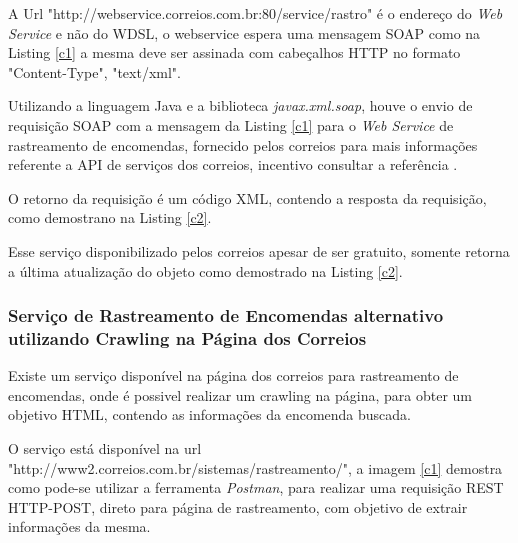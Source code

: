 \documentclass[12pt]{article}
\begin{document}
A Url "http://webservice.correios.com.br:80/service/rastro" é o endereço do \textit{Web Service} e não do WDSL, o webservice espera uma mensagem SOAP como na Listing \ref{c1} a mesma deve ser assinada com cabeçalhos HTTP no formato "Content-Type", "text/xml".


Utilizando a linguagem Java e a biblioteca \textit{javax.xml.soap}, houve o envio de requisição SOAP com a mensagem da Listing \ref{c1} para o \textit{Web Service} de rastreamento de encomendas, fornecido pelos correios para mais informações referente a API de serviços dos correios, incentivo consultar a referência \cite{correios}.

O retorno da requisição é um código XML, contendo a resposta da requisição, como demostrano na Listing \ref{c2}.
 
 Esse serviço disponibilizado pelos correios apesar de ser gratuito, somente retorna a última atualização do objeto como demostrado na Listing \ref{c2}.
\subsubsection{Serviço de Rastreamento de Encomendas alternativo utilizando Crawling na Página dos Correios}

	Existe um serviço disponível na página dos correios para rastreamento de encomendas, onde é possivel realizar um crawling na página, para obter um objetivo HTML, contendo as informações da encomenda buscada.
	
	O serviço está disponível na url "http://www2.correios.com.br/sistemas/rastreamento/", a imagem \ref{c1} demostra como pode-se utilizar a ferramenta \textit{Postman}, para realizar uma requisição REST HTTP-POST, direto para página de rastreamento, com objetivo de extrair informações da mesma.
	
\end{document}
